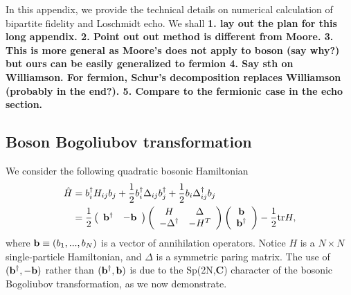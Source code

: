 
In this appendix, we provide the technical details on numerical calculation of bipartite fidelity and Loschmidt echo. We shall {\bf\color{red}1. lay out the plan for this long appendix. 2. Point out out method is different from Moore. 3. This is more general as Moore's does not apply to boson (say why?) but ours can be easily generalized to fermion 4. Say sth on Williamson. For fermion, Schur's decomposition replaces Williamson (probably in the end?). 5. Compare to the fermionic case in the echo section. } 

\subsection{Boson Bogoliubov transformation}
\label{Boson BdG}
We consider the following quadratic bosonic Hamiltonian
\begin{eqnarray}\begin{aligned}
\label{Quadratic boson H}
\hat{H}&=b_i^\dagger H_{ij}b_j+\frac{1}{2}b^\dagger_i\Delta_{ij}b_j^\dagger+\frac{1}{2}b_i\Delta^\dagger_{ij}b_j\\
&=\frac{1}{2}
\left(\begin{array}{ccc}
{\bf b}^\dagger & -{\bf b}
\end{array}\right)
\left(\begin{array}{ccc}
H & \Delta\\
-\Delta^\dagger & -H^T
\end{array}\right)
\left(\begin{array}{ccc}
{\bf b} \\
{\bf b}^\dagger
\end{array}\right)-\frac{1}{2}\text{tr}H,
\end{aligned}\end{eqnarray}
where ${\bf b}\equiv(b_{1},...,b_{N})$ is a vector of annihilation operators. Notice $H$ is a $N\times N$ single-particle Hamiltonian, and $\Delta$ is a symmetric paring matrix. The use of $({\bf b}^\dagger , -{\bf b})$ rather than $({\bf b}^\dagger , {\bf b})$ is due to the Sp(2N,{\bf C}) character of the bosonic Bogoliubov transformation, as we now demonstrate. 

